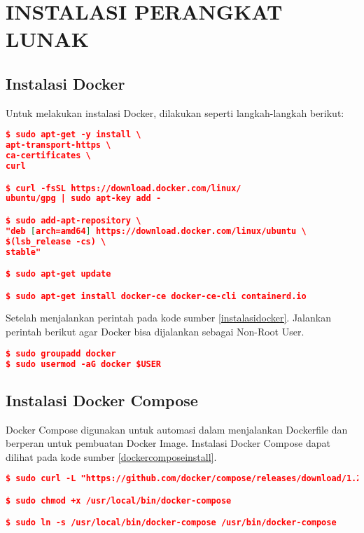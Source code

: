 \chapter{INSTALASI PERANGKAT LUNAK}

\section*{Instalasi Docker}
	Untuk melakukan instalasi Docker, dilakukan seperti langkah-langkah berikut:
\begin{lstlisting}[frame=single,tabsize=2,breaklines,caption={Perintah untuk instalasi Docker },label=instalasidocker, captionpos=b, language=json,numbers=none]
$ sudo apt-get -y install \
apt-transport-https \
ca-certificates \
curl

$ curl -fsSL https://download.docker.com/linux/
ubuntu/gpg | sudo apt-key add -

$ sudo add-apt-repository \
"deb [arch=amd64] https://download.docker.com/linux/ubuntu \
$(lsb_release -cs) \
stable"

$ sudo apt-get update

$ sudo apt-get install docker-ce docker-ce-cli containerd.io
\end{lstlisting}
	
	Setelah menjalankan perintah pada kode sumber \ref{instalasidocker}. Jalankan perintah berikut agar Docker bisa dijalankan sebagai Non-Root User.
\begin{lstlisting}[frame=single,tabsize=2,breaklines,caption={Perintah untuk mengubah hak User },label=nonrootuser, captionpos=b, language=json,numbers=none]
$ sudo groupadd docker
$ sudo usermod -aG docker $USER
\end{lstlisting}

\section*{Instalasi Docker Compose}
Docker Compose digunakan untuk automasi dalam menjalankan Dockerfile dan berperan untuk pembuatan Docker Image. Instalasi Docker Compose dapat dilihat pada kode sumber \ref{dockercomposeinstall}.

\begin{lstlisting}[frame=single,tabsize=2,breaklines,caption={Perintah instalasi Docker Compose},label=dockercomposeinstall, captionpos=b, language=json,numbers=none]
$ sudo curl -L "https://github.com/docker/compose/releases/download/1.24.0/docker-compose-$(uname -s)-$(uname -m)" -o /usr/local/bin/docker-compose

$ sudo chmod +x /usr/local/bin/docker-compose

$ sudo ln -s /usr/local/bin/docker-compose /usr/bin/docker-compose
\end{lstlisting}
